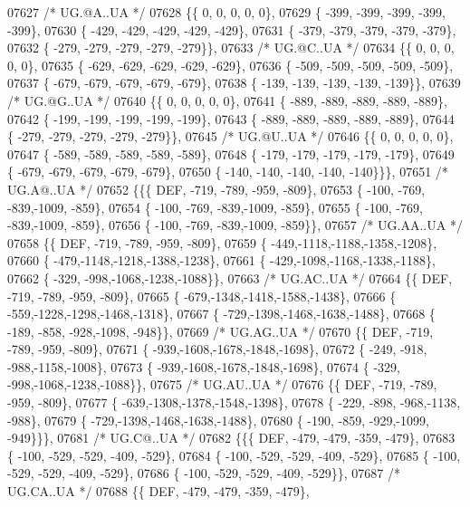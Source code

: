 \begin{DoxyCode}
07627 \textcolor{comment}{/* UG.@A..UA */}
07628 \{\{    0,    0,    0,    0,    0\},
07629 \{ -399, -399, -399, -399, -399\},
07630 \{ -429, -429, -429, -429, -429\},
07631 \{ -379, -379, -379, -379, -379\},
07632 \{ -279, -279, -279, -279, -279\}\},
07633 \textcolor{comment}{/* UG.@C..UA */}
07634 \{\{    0,    0,    0,    0,    0\},
07635 \{ -629, -629, -629, -629, -629\},
07636 \{ -509, -509, -509, -509, -509\},
07637 \{ -679, -679, -679, -679, -679\},
07638 \{ -139, -139, -139, -139, -139\}\},
07639 \textcolor{comment}{/* UG.@G..UA */}
07640 \{\{    0,    0,    0,    0,    0\},
07641 \{ -889, -889, -889, -889, -889\},
07642 \{ -199, -199, -199, -199, -199\},
07643 \{ -889, -889, -889, -889, -889\},
07644 \{ -279, -279, -279, -279, -279\}\},
07645 \textcolor{comment}{/* UG.@U..UA */}
07646 \{\{    0,    0,    0,    0,    0\},
07647 \{ -589, -589, -589, -589, -589\},
07648 \{ -179, -179, -179, -179, -179\},
07649 \{ -679, -679, -679, -679, -679\},
07650 \{ -140, -140, -140, -140, -140\}\}\},
07651 \textcolor{comment}{/* UG.A@..UA */}
07652 \{\{\{  DEF, -719, -789, -959, -809\},
07653 \{ -100, -769, -839,-1009, -859\},
07654 \{ -100, -769, -839,-1009, -859\},
07655 \{ -100, -769, -839,-1009, -859\},
07656 \{ -100, -769, -839,-1009, -859\}\},
07657 \textcolor{comment}{/* UG.AA..UA */}
07658 \{\{  DEF, -719, -789, -959, -809\},
07659 \{ -449,-1118,-1188,-1358,-1208\},
07660 \{ -479,-1148,-1218,-1388,-1238\},
07661 \{ -429,-1098,-1168,-1338,-1188\},
07662 \{ -329, -998,-1068,-1238,-1088\}\},
07663 \textcolor{comment}{/* UG.AC..UA */}
07664 \{\{  DEF, -719, -789, -959, -809\},
07665 \{ -679,-1348,-1418,-1588,-1438\},
07666 \{ -559,-1228,-1298,-1468,-1318\},
07667 \{ -729,-1398,-1468,-1638,-1488\},
07668 \{ -189, -858, -928,-1098, -948\}\},
07669 \textcolor{comment}{/* UG.AG..UA */}
07670 \{\{  DEF, -719, -789, -959, -809\},
07671 \{ -939,-1608,-1678,-1848,-1698\},
07672 \{ -249, -918, -988,-1158,-1008\},
07673 \{ -939,-1608,-1678,-1848,-1698\},
07674 \{ -329, -998,-1068,-1238,-1088\}\},
07675 \textcolor{comment}{/* UG.AU..UA */}
07676 \{\{  DEF, -719, -789, -959, -809\},
07677 \{ -639,-1308,-1378,-1548,-1398\},
07678 \{ -229, -898, -968,-1138, -988\},
07679 \{ -729,-1398,-1468,-1638,-1488\},
07680 \{ -190, -859, -929,-1099, -949\}\}\},
07681 \textcolor{comment}{/* UG.C@..UA */}
07682 \{\{\{  DEF, -479, -479, -359, -479\},
07683 \{ -100, -529, -529, -409, -529\},
07684 \{ -100, -529, -529, -409, -529\},
07685 \{ -100, -529, -529, -409, -529\},
07686 \{ -100, -529, -529, -409, -529\}\},
07687 \textcolor{comment}{/* UG.CA..UA */}
07688 \{\{  DEF, -479, -479, -359, -479\},

\end{DoxyCode}
